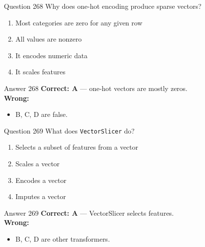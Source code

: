\documentclass[aspectratio=169,11pt]{beamer}
\begin{document}
	\begin{frame}{Question 268}
		Why does one-hot encoding produce sparse vectors?
		\begin{enumerate}[label=\Alph*.]
			\item Most categories are zero for any given row
			\item All values are nonzero
			\item It encodes numeric data
			\item It scales features
		\end{enumerate}
	\end{frame}
	\begin{frame}{Answer 268}
		\textbf{Correct: A} --- one-hot vectors are mostly zeros.\\
		\vspace{0.5em}
		\textbf{Wrong:}
		\begin{itemize}
			\item B, C, D are false.
		\end{itemize}
	\end{frame}
	
	\begin{frame}{Question 269}
		What does \texttt{VectorSlicer} do?
		\begin{enumerate}[label=\Alph*.]
			\item Selects a subset of features from a vector
			\item Scales a vector
			\item Encodes a vector
			\item Imputes a vector
		\end{enumerate}
	\end{frame}
	\begin{frame}{Answer 269}
		\textbf{Correct: A} --- VectorSlicer selects features.\\
		\vspace{0.5em}
		\textbf{Wrong:}
		\begin{itemize}
			\item B, C, D are other transformers.
		\end{itemize}
	\end{frame}
	
\end{document}
